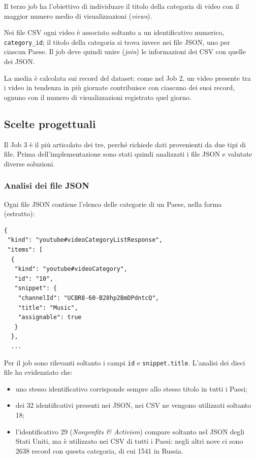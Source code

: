 \documentclass[12pt, a4paper]{article}
\begin{document}
Il terzo job ha l'obiettivo di individuare il titolo
della categoria di video con il maggior numero medio
di visualizzazioni (\textit{views}).

Nei file CSV ogni video è associato soltanto
a un identificativo numerico, \texttt{category\_id};
il titolo della categoria si trova invece nei file JSON,
uno per ciascun Paese. Il job deve quindi unire
(\textit{join}) le informazioni dei CSV con quelle dei JSON.

La media è calcolata sui record del dataset:
come nel Job 2, un video presente tra i video in tendenza
in più giornate contribuisce con ciascuno dei suoi record,
ognuno con il numero di visualizzazioni registrato quel giorno.

\subsection{Scelte progettuali}

Il Job 3 è il più articolato dei tre, perché richiede
dati provenienti da due tipi di file. Prima
dell'implementazione sono stati quindi analizzati
i file JSON e valutate diverse soluzioni.

\subsubsection{Analisi dei file JSON}

Ogni file JSON contiene l'elenco delle categorie
di un Paese, nella forma (estratto):

\begin{verbatim}
{
 "kind": "youtube#videoCategoryListResponse",
 "items": [
  {
   "kind": "youtube#videoCategory",
   "id": "10",
   "snippet": {
    "channelId": "UCBR8-60-B28hp2BmDPdntcQ",
    "title": "Music",
    "assignable": true
   }
  },
  ...
\end{verbatim}

Per il job sono rilevanti soltanto i campi \texttt{id}
e \texttt{snippet.title}. L'analisi dei dieci file ha evidenziato che:

\begin{itemize}
    \item uno stesso identificativo corrisponde sempre
    allo stesso titolo in tutti i Paesi;
    \item dei 32 identificativi presenti nei JSON,
    nei CSV ne vengono utilizzati soltanto 18;
    \item l'identificativo 29 (\textit{Nonprofits \& Activism})
    compare soltanto nel JSON degli Stati Uniti, ma è utilizzato
    nei CSV di tutti i Paesi: negli altri nove ci sono
    2638 record con questa categoria, di cui 1541 in Russia.
\end{itemize}
\end{document}

